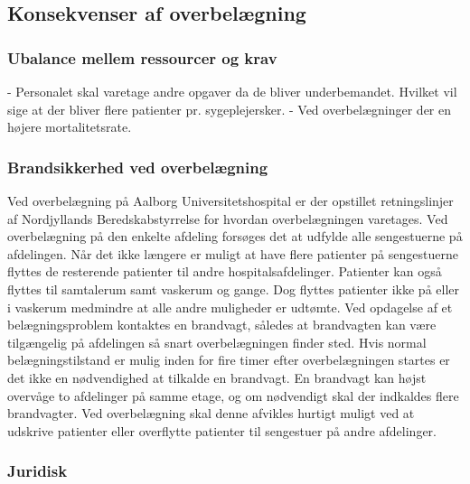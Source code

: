 \subsection{Konsekvenser af overbelægning}


\subsubsection{Ubalance mellem ressourcer og krav}
- Personalet skal varetage andre opgaver da de bliver underbemandet. Hvilket vil sige at der bliver flere patienter pr. sygeplejersker. 
- Ved overbelægninger der en højere mortalitetsrate. 




\subsubsection{Brandsikkerhed ved overbelægning}
Ved overbelægning på Aalborg Universitetshospital er der opstillet retningslinjer af Nordjyllands Beredskabstyrrelse for hvordan overbelægningen varetages. \citep{Beredskab2016} Ved overbelægning på den enkelte afdeling forsøges det at udfylde alle sengestuerne på afdelingen. Når det ikke længere er muligt at have flere patienter på sengestuerne flyttes de resterende patienter til andre hospitalsafdelinger. Patienter kan også flyttes til samtalerum samt vaskerum og gange. \citep{Beredskab2016} Dog flyttes patienter ikke på eller i vaskerum medmindre at alle andre muligheder er udtømte. 
Ved opdagelse af et belægningsproblem kontaktes en brandvagt, således at brandvagten kan være tilgængelig på afdelingen så snart overbelægningen finder sted. Hvis normal belægningstilstand er mulig inden for fire timer efter overbelægningen startes er det ikke en nødvendighed at tilkalde en brandvagt. En brandvagt kan højst overvåge to afdelinger på samme etage, og om nødvendigt skal der indkaldes flere brandvagter. \citep{Beredskab2016} Ved overbelægning skal denne afvikles hurtigt muligt ved at udskrive patienter eller overflytte patienter til sengestuer på andre afdelinger. 

\subsubsection{Juridisk}

